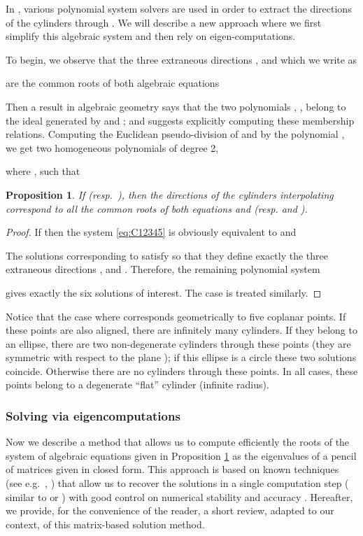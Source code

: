 \documentclass[5p]{elsarticle}
\newtheorem{prop}[thm]{Proposition}
\newcommand{\com}[1]{{\color{black} #1}}
\newcommand{\lb}[1]{{\color{black} #1}}
\begin{document}
  
In \cite{Devillers02,BKM05,Lichtblau12}, various polynomial system solvers are used in order to extract the directions of the cylinders through . We will describe a new approach where we first simplify this algebraic system and then rely on eigen-computations.   

\com{To begin}, we observe that the three extraneous directions ,  and  which \com{we write as} 

are the common roots of both algebraic equations  

Then a result in algebraic geometry says that the two polynomials , , belong to the ideal generated by  and ; and suggests {explicitly computing} these membership relations. Computing the Euclidean pseudo-division of  and  by the polynomial , we get two homogeneous polynomials of degree 2,
 
where , such that


\begin{prop}\label{eq:systCD} If  (resp.~), then the directions of the cylinders interpolating  \com{correspond to} all the common roots of both equations   and 
	 (resp.  and ).	
\end{prop}
\begin{proof} If  then the system \eqref{eq:C12345} is obviously equivalent to  and

The solutions corresponding to  satisfy  so that they define exactly the three extraneous 	directions ,  and . 
Therefore, the remaining polynomial system 

gives exactly the six solutions of interest. The case  is treated similarly.
\end{proof}

\com{Notice} that the case where  corresponds geometrically to five coplanar points. If these points are also aligned, \com{there are} infinitely many cylinders. 
\com{
If they belong to an \com{ellipse}, there are two \com{non-degenerate} cylinders \com{through} these points (they are symmetric with respect to the plane ); if this ellipse is a circle these two solutions coincide. Otherwise there are no cylinders through these points.
In all cases, \com{these points} belong to a \com{degenerate} ``flat'' cylinder (infinite radius).
}
\subsubsection{Solving via eigencomputations}\label{subsec:cyl5P}

\com{Now we describe a method that allows us to compute efficiently the roots of the system of algebraic equations given in Proposition \ref{eq:systCD} as the eigenvalues of a pencil of matrices given in closed form. This approach is based on known techniques (see e.g.~\cite{Stetter:1996:MEH:242961.242966}, \cite[\S 1]{Cox05})  \lb{that allow us} to recover the solutions in a single computation step (\lb{similar to} \cite[Appendix]{Devillers02} or \cite{BKM05}) \lb{with good control on}  numerical stability and accuracy \cite{EM95}. Hereafter, \lb{we provide, for the convenience of the reader, a short review, adapted to our context, of this matrix-based solution method}.} 
\end{document}
